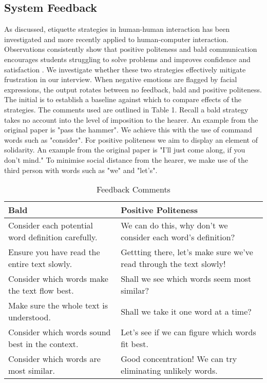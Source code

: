 \documentclass[12pt,a4paper]{article}
\begin{document}
\subsection*{System Feedback}
As discussed, etiquette strategies in human-human interaction has been investigated and more recently applied to human-computer interaction. Observations consistently show that positive politeness and bald communication encourages students struggling to solve problems and improves confidence and satisfaction \cite{yang2018evaluating}. We investigate whether these two strategies effectively mitigate frustration in our interview. When negative emotions are flagged by facial expressions, the output rotates between no feedback, bald and positive politeness. The initial is to establish a baseline against which to compare effects of the strategies. The comments used are outlined in Table 1. Recall a bald strategy takes no account into the level of imposition to the hearer. An example from the original paper \cite{brown1987politeness} is "pass the hammer". We achieve this with the use of command words such as "consider". For positive politeness we aim to display an element of solidarity. An example from the original paper is "I'll just come along, if you don't mind." To minimise social distance from the hearer, we make use of the third person with words such as "we" and "let's".
	
	\begin{table}[h]
		\centering
		\caption{Feedback Comments}
		\begin{tabularx}{\linewidth}{|l|>{\raggedright\arraybackslash}X|}
			\hline
	 {\bf Bald} & {\bf Positive Politeness} \\ \hline
		Consider each potential word definition carefully. & We can do this, why don’t we consider each word’s definition? \\ \hline
		Ensure you have read the entire text slowly. & Gettting there, let’s make sure we’ve read through the text slowly! \\ \hline
		Consider which words make the text flow best. & Shall we see which words seem most similar?\\ \hline
		Make sure the whole text is understood. &  Shall we take it one word at a time?\\ \hline
		Consider which words sound best in the context. & Let’s see if we can figure which words fit best. \\ \hline
		Consider which words are most similar. & Good concentration! We can try eliminating unlikely words.\\ \hline
\end{tabularx}
\end{table}
\end{document}
